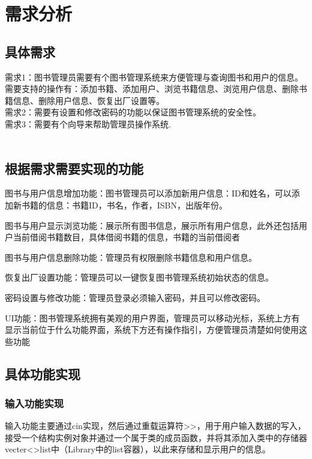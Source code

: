 \documentclass{article}
\begin{document}
\section{需求分析}

\subsection{具体需求}
\noindent
需求1：图书管理员需要有个图书管理系统来方便管理与查询图书和用户的信息。需要支持的操作有：添加书籍、添加用户、浏览书籍信息、浏览用户信息、删除书籍信息、删除用户信息、恢复出厂设置等。\\
需求2：需要有设置和修改密码的功能以保证图书管理系统的安全性。\\
需求3：需要有个向导来帮助管理员操作系统.\\\\

\subsection{根据需求需要实现的功能}
图书与用户信息增加功能：图书管理员可以添加新用户信息：ID和姓名，可以添加新书籍的信息：书籍ID，书名，作者，ISBN，出版年份。

图书与用户显示浏览功能：展示所有图书信息，展示所有用户信息，此外还包括用户当前借阅书籍数目，具体借阅书籍的信息，书籍的当前借阅者

图书与用户信息删除功能：管理员有权限删除书籍信息和用户信息。

恢复出厂设置功能：管理员可以一键恢复图书管理系统初始状态的信息。

密码设置与修改功能：管理员登录必须输入密码，并且可以修改密码。

UI功能：图书管理系统拥有美观的用户界面，管理员可以移动光标，系统上方有显示当前位于什么功能界面，系统下方还有操作指引，方便管理员清楚如何使用这些功能\\
\subsection{具体功能实现}
\subsubsection{输入功能实现}
输入功能主要通过cin实现，然后通过重载运算符>>，用于用户输入数据的写入，接受一个结构实例对象并通过一个属于类的成员函数，并将其添加入类中的存储器vecter<>list中（Library中的list容器），以此来存储和显示用户的信息。\\
\end{document}
